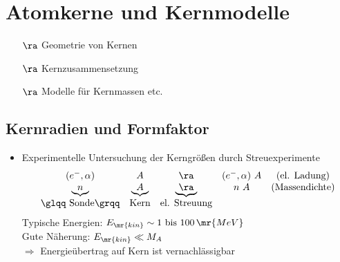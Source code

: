 \chapter{Atomkerne und Kernmodelle}
\begin{itemize}
\item[$\ra$] Geometrie von Kernen
\item[$\ra$] Kernzusammensetzung
\item[$\ra$] Modelle für Kernmassen etc.
\end{itemize}

\section{Kernradien und Formfaktor}
\begin{itemize}
\item Experimentelle Untersuchung der Kerngrößen durch Streuexperimente
\begin{align}
\begin{matrix}
(e^- , \alpha) & A & \ra & (e^- , \alpha)\ A & \text{(el. Ladung)}\\
\underbrace{\ n \ } & \underbrace{\ A \ } & \underbrace{\ \ra \ } & n\ A & \text{(Massendichte)} \\
 \text{\glqq Sonde\grqq} & \text{Kern} & \text{el. Streuung} & & 
\end{matrix}
\end{align}
Typische Energien: $E_\mr{kin}\sim 1 \text{ bis } 100\,\mr{MeV}$\\
Gute Näherung: $E_\mr{kin} \ll M_A$\\
$\Rightarrow$ Energieübertrag auf Kern ist vernachlässigbar
\begin{figure}[!ht]
	\centering
\end{figure}
\end{itemize}
